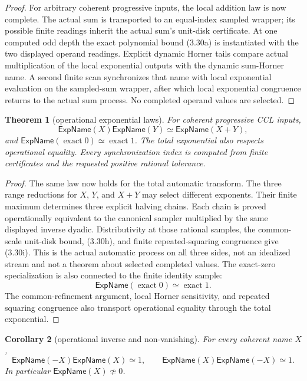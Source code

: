 \documentclass[10pt]{article}
\newtheorem{theorem}{Theorem}[section]
\newtheorem{corollary}[theorem]{Corollary}
\theoremstyle{definition}
\theoremstyle{remark}
\begin{document}
\begin{proof}
For arbitrary coherent progressive inputs, the local addition law is now
complete.  The actual sum is transported to an equal-index sampled wrapper;
its possible finite readings inherit the actual sum's unit-disk certificate.
At one computed odd depth the exact polynomial bound (3.30a) is instantiated
with the two displayed operand readings.  Explicit dynamic Horner tails
compare actual multiplication of the local exponential outputs with the
dynamic sum-Horner name.  A second finite scan synchronizes that name with
local exponential evaluation on the sampled-sum wrapper, after which local
exponential congruence returns to the actual sum process.  No completed
operand values are selected.
\end{proof}

\begin{theorem}[operational exponential laws]
\label{thm:operational-exponential-laws}
For coherent progressive CCL inputs,
\[
 \mathsf{ExpName}(X)\mathsf{ExpName}(Y)
 \simeq \mathsf{ExpName}(X+Y),
\tag{3.30i}
\]
and $\mathsf{ExpName}(\operatorname{exact}0)\simeq
\operatorname{exact}1$.  The total exponential also respects operational
equality.  Every synchronization index is computed from finite certificates
and the requested positive rational tolerance.
\end{theorem}

\begin{proof}
The same law now holds for the total automatic transform.  The three range
reductions for $X$, $Y$, and $X+Y$ may select different exponents.  Their
finite maximum determines three explicit halving chains.  Each chain is
proved operationally equivalent to the canonical sampler multiplied by the
same displayed inverse dyadic.  Distributivity at those rational samples,
the common-scale unit-disk bound, (3.30h), and finite repeated-squaring
congruence give (3.30i).  This is the actual automatic
process on all three sides, not an idealized stream and not a theorem about
selected completed values.  The exact-zero specialization is also connected
to the finite identity sample:
\[
 \mathsf{ExpName}(\operatorname{exact}0)
 \simeq \operatorname{exact}1.
 \tag{3.30j}
\]
The common-refinement argument, local Horner sensitivity, and repeated
squaring congruence also transport operational equality through the total
exponential.
\end{proof}

\begin{corollary}[operational inverse and non-vanishing]
For every coherent name $X$,
\[
 \mathsf{ExpName}(-X)\mathsf{ExpName}(X)\simeq1,
 \qquad
 \mathsf{ExpName}(X)\mathsf{ExpName}(-X)\simeq1.
\tag{3.30k}
\]
In particular $\mathsf{ExpName}(X)\not\simeq0$.
\end{corollary}
\end{document}
